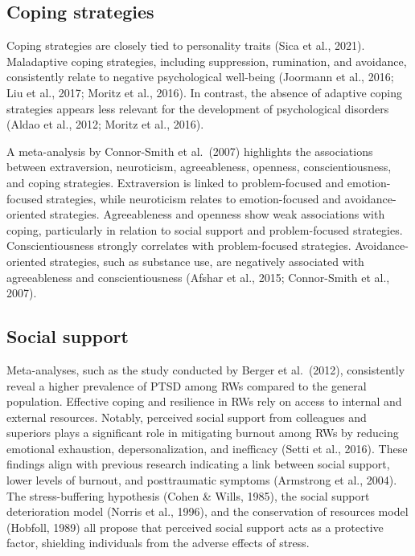 \documentclass[
  man]{apa7}
\begin{document}
\hypertarget{coping-strategies}{%
\subsection{Coping strategies}\label{coping-strategies}}

Coping strategies are closely tied to personality traits (Sica et al., 2021). Maladaptive coping strategies, including suppression, rumination, and avoidance, consistently relate to negative psychological well-being (Joormann et al., 2016; Liu et al., 2017; Moritz et al., 2016). In contrast, the absence of adaptive coping strategies appears less relevant for the development of psychological disorders (Aldao et al., 2012; Moritz et al., 2016).

A meta-analysis by Connor-Smith et al.~(2007) highlights the associations between extraversion, neuroticism, agreeableness, openness, conscientiousness, and coping strategies. Extraversion is linked to problem-focused and emotion-focused strategies, while neuroticism relates to emotion-focused and avoidance-oriented strategies. Agreeableness and openness show weak associations with coping, particularly in relation to social support and problem-focused strategies. Conscientiousness strongly correlates with problem-focused strategies. Avoidance-oriented strategies, such as substance use, are negatively associated with agreeableness and conscientiousness (Afshar et al., 2015; Connor-Smith et al., 2007).

\hypertarget{social-support}{%
\subsection{Social support}\label{social-support}}

Meta-analyses, such as the study conducted by Berger et al.~(2012), consistently reveal a higher prevalence of PTSD among RWs compared to the general population. Effective coping and resilience in RWs rely on access to internal and external resources. Notably, perceived social support from colleagues and superiors plays a significant role in mitigating burnout among RWs by reducing emotional exhaustion, depersonalization, and inefficacy (Setti et al., 2016). These findings align with previous research indicating a link between social support, lower levels of burnout, and posttraumatic symptoms (Armstrong et al., 2004). The stress-buffering hypothesis (Cohen \& Wills, 1985), the social support deterioration model (Norris et al., 1996), and the conservation of resources model (Hobfoll, 1989) all propose that perceived social support acts as a protective factor, shielding individuals from the adverse effects of stress.
\end{document}
